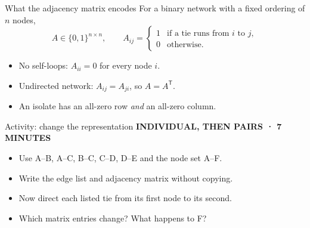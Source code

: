 \documentclass[aspectratio=169,11pt]{beamer}
\newcommand{\activity}[1]{{\small\color{accent}\bfseries #1}\par\medskip}
\begin{document}
\begin{frame}{What the adjacency matrix encodes}
For a binary network with a fixed ordering of $n$ nodes,
\[A\in\{0,1\}^{n\times n},\qquad
A_{ij}=\begin{cases}1&\text{if a tie runs from }i\text{ to }j,\\0&\text{otherwise.}\end{cases}\]
\begin{itemize}
\item No self-loops: $A_{ii}=0$ for every node $i$.
\medskip
\item Undirected network: $A_{ij}=A_{ji}$, so $A=A^{\mathsf T}$.
\medskip
\item An isolate has an all-zero row \emph{and} an all-zero column.
\end{itemize}
\end{frame}

\begin{frame}{Activity: change the representation}
\activity{INDIVIDUAL, THEN PAIRS · 7 MINUTES}
\begin{itemize}
\item Use A--B, A--C, B--C, C--D, D--E and the node set A--F.
\medskip
\item Write the edge list and adjacency matrix without copying.
\medskip
\item Now direct each listed tie from its first node to its second.
\medskip
\item Which matrix entries change? What happens to F?
\medskip
\end{itemize}

\end{frame}
\end{document}
